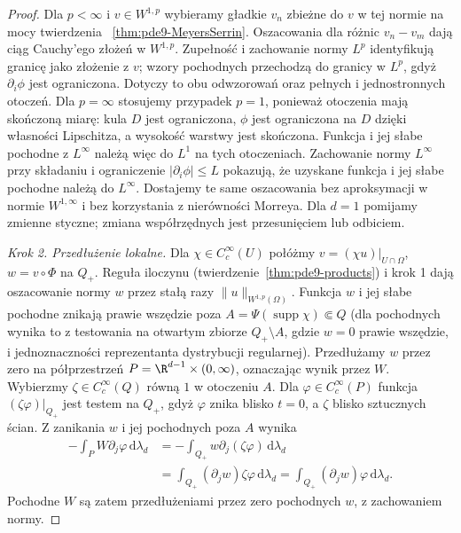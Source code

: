 \begin{proof}
Dla $p<\infty$ i $v\in W^{1,p}$ wybieramy gładkie
$v_n$ zbieżne do $v$ w tej normie na mocy twierdzenia
~\ref{thm:pde9-MeyersSerrin}. Oszacowania dla różnic
$v_n-v_m$ dają ciąg Cauchy'ego złożeń w $W^{1,p}$.
Zupełność i zachowanie normy $L^p$ identyfikują granicę
jako złożenie z $v$; wzory pochodnych przechodzą
do granicy w $L^p$, gdyż $\partial_i\phi$ jest ograniczona.
Dotyczy to obu odwzorowań oraz pełnych i jednostronnych
otoczeń. Dla $p=\infty$ stosujemy przypadek $p=1$,
ponieważ otoczenia mają skończoną miarę: kula $D$
jest ograniczona, $\phi$ jest ograniczona na $D$
dzięki własności Lipschitza, a wysokość warstwy
jest skończona. Funkcja i jej słabe pochodne
z $L^\infty$ należą więc do $L^1$ na tych otoczeniach.
Zachowanie normy $L^\infty$ przy składaniu i ograniczenie
$|\partial_i\phi|\le L$ pokazują, że uzyskane funkcja
i jej słabe pochodne należą do $L^\infty$.
Dostajemy te same oszacowania bez aproksymacji
w normie $W^{1,\infty}$ i bez korzystania
z nierówności Morreya.
Dla $d=1$ pomijamy zmienne styczne; zmiana współrzędnych
jest przesunięciem lub odbiciem.

\emph{Krok 2. Przedłużenie lokalne.}
Dla $\chi\in C_c^\infty(U)$ połóżmy
$v=(\chi u)|_{U\cap\Omega}$, $w=v\circ\Phi$ na $Q_+$.
Reguła iloczynu (twierdzenie~\ref{thm:pde9-products})
i krok 1 dają oszacowanie normy $w$ przez stałą razy
$\|u\|_{W^{1,p}(\Omega)}$.
Funkcja $w$ i jej słabe pochodne znikają prawie wszędzie
poza $A=\Psi(\operatorname{supp}\chi)\Subset Q$
(dla pochodnych wynika to z testowania na otwartym
zbiorze $Q_+\setminus A$, gdzie $w=0$ prawie wszędzie,
i jednoznaczności reprezentanta dystrybucji regularnej).
Przedłużamy $w$ przez zero na półprzestrzeń
$P=\R^{d-1}\times(0,\infty)$, oznaczając wynik przez $W$.
Wybierzmy $\zeta\in C_c^\infty(Q)$ równą $1$ w otoczeniu
$A$. Dla $\varphi\in C_c^\infty(P)$ funkcja
$(\zeta\varphi)|_{Q_+}$ jest testem na $Q_+$,
gdyż $\varphi$ znika blisko $t=0$, a $\zeta$ blisko
sztucznych ścian. Z zanikania $w$ i jej pochodnych
poza $A$ wynika
\[
 \begin{aligned}
 -\int_P W\partial_j\varphi\,\mathrm d\lambda_d
 &=-\int_{Q_+}w\partial_j(\zeta\varphi)\,\mathrm d\lambda_d\\
 &=\int_{Q_+}(\partial_jw)\zeta\varphi\,\mathrm d\lambda_d
 =\int_{Q_+}(\partial_jw)\varphi\,\mathrm d\lambda_d.
 \end{aligned}
\]
Pochodne $W$ są zatem przedłużeniami przez zero
pochodnych $w$, z zachowaniem normy.


\end{proof}
